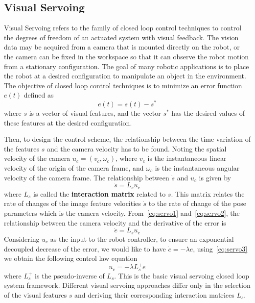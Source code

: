 \subsection{Visual Servoing}
Visual Servoing refers to the family of closed loop control techniques to control the degrees of freedom of an actuated system with visual feedback\cite{chaumette2006visual}. The vision data may be acquired from a camera that is mounted directly on the robot, or the camera can be fixed in the workspace so that it can observe the robot motion from a stationary configuration. The goal of many robotic applications is to place the robot at a desired configuration to manipulate an object in the environment. The objective of closed loop control techniques is to minimize an error function $e(t)$ defined as
\begin{equation}
  e(t) = s(t) - s^{*}
  \label{eq:servo1}
\end{equation}
where $s$ is a vector of visual features, and the vector $s^*$ has the desired values of these features at the desired configuration.

Then, to design the control scheme, the relationship between the time variation of the features $s$ and the camera velocity has to be found. Noting the spatial velocity of the camera $u_c = (v_c, \omega_c)$, where $v_c$ is the instantaneous linear velocity of the origin of the camera frame, and $\omega_c$ is the instantaneous angular velocity of the camera frame. The relationship between $\dot{s}$ and $u_c$ is given by
\begin{equation}
  \dot{s} = L_s u_c
  \label{eq:servo2}
\end{equation}
where $L_s$ is called the \textbf{interaction matrix} related to $s$. This matrix relates the rate of changes of the image feature velocities $\dot{s}$ to the rate of change of the pose parameters which is the camera velocity. From~\eqref{eq:servo1} and~\eqref{eq:servo2}, the relationship between the camera velocity and the derivative of the error is
\begin{equation}
  \dot{e} = L_s u_c
\label{eq:servo3}
\end{equation}
Considering $u_c$ as the input to the robot controller, to ensure an exponential decoupled decrease of the error, we would like to have $\dot{e} = -\lambda e$, using~\eqref{eq:servo3} we obtain the following control law equation
\begin{equation}
  u_c = -\lambda L_{s}^{+} e
\label{eq:servo4}
\end{equation}
where $L_{s}^{+}$ is the pseudo-inverse of $L_s$. This is the basic visual servoing closed loop system framework. Different visual servoing approaches differ only in the selection of the visual features $s$ and deriving their corresponding interaction matrices $L_s$.

